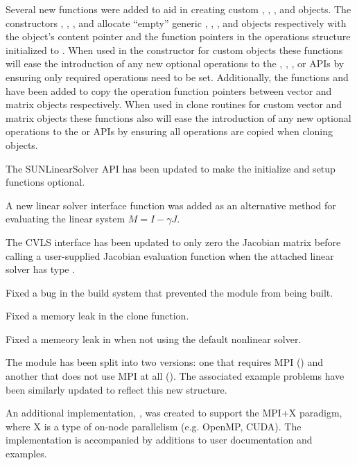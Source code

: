 Several new functions were added to aid in creating custom {\nvector},
{\sunmatrix}, {\sunlinsol}, and {\sunnonlinsol} objects. The constructors
, , , and
 allocate ``empty'' generic {\nvector}, {\sunmatrix},
{\sunlinsol}, and {\sunnonlinsol} objects respectively with the object's content
pointer and the function pointers in the operations structure initialized to
. When used in the constructor for custom objects these functions will
ease the introduction of any new optional operations to the {\nvector},
{\sunmatrix}, {\sunlinsol}, or  {\sunnonlinsol} APIs by ensuring only required
operations need to be set. Additionally, the functions 
and  have been added to copy the operation function
pointers between vector and matrix objects respectively. When used in clone
routines for custom vector and matrix objects these functions also will ease the
introduction of any new optional operations to the {\nvector} or {\sunmatrix}
APIs by ensuring all operations are copied when cloning objects.

The SUNLinearSolver API has been updated to make the initialize and setup
functions optional.

A new linear solver interface function  was added as an
alternative method for evaluating the linear system $M = I - \gamma J$. 

The CVLS interface has been updated to only zero the Jacobian matrix before
calling a user-supplied Jacobian evaluation function when the attached linear
solver has type .

Fixed a bug in the build system that prevented the {\nvecpthreads} module from
being built.

Fixed a memory leak in the {\nvecpetsc} clone function.

Fixed a memeory leak in {\fcvode} when not using the default nonlinear solver.

The {\nvecmanyvector} module has been split into two versions: one
that requires MPI ({\nvecmpimanyvector}) and another that does not use
MPI at all ({\nvecmanyvector}).  The associated example problems have
been similarly updated to reflect this new structure.

An additional {\nvector} implementation, {\nvecmpiplusx}, was created to support
the MPI+X paradigm, where X is a type of on-node parallelism (e.g. OpenMP, CUDA).
The implementation is accompanied by additions to user documentation and {\sundials}
examples.


